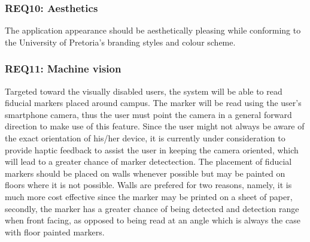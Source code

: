 		\subsubsection{REQ10: Aesthetics}
			The application appearance should be aesthetically pleasing while conforming to the University of Pretoria's branding styles and colour scheme.

		\subsubsection{REQ11: Machine vision}
			Targeted toward the visually disabled users, the system will be able to read fiducial markers placed around campus. The marker will be read using the user's smartphone camera, thus the user must point the camera in a general forward direction to make use of this feature. Since the user might not always be aware of the exact orientation of his/her device, it is currently under consideration to provide haptic feedback to assist the user in keeping the camera oriented, which will lead to a greater chance of marker detectection. The placement of fiducial markers should be placed on walls whenever possible but may be painted on floors where it is not possible. Walls are prefered for two reasons, namely, it is much more cost effective since the marker may be printed on a sheet of paper, secondly, the marker has a greater chance of being detected and detection range when front facing, as opposed to being read at an angle which is always the case with floor painted markers.

%			

%
%	
%			
%			

